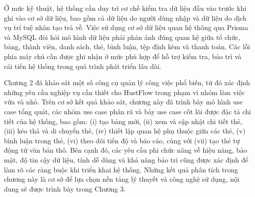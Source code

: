 \documentclass[../DoAn.tex]{subfiles}
\begin{document}
Ở mức kỹ thuật, hệ thống cần duy trì cơ chế kiểm tra dữ liệu đầu vào trước khi ghi vào cơ sở dữ liệu, bao gồm cả dữ liệu do người dùng nhập và dữ liệu do dịch vụ trí tuệ nhân tạo trả về. Việc sử dụng cơ sở dữ liệu quan hệ thông qua Prisma và MySQL đòi hỏi mô hình dữ liệu phải phản ánh đúng quan hệ giữa tổ chức, bảng, thành viên, danh sách, thẻ, bình luận, tệp đính kèm và thanh toán. Các lỗi phía máy chủ cần được ghi nhận ở mức phù hợp để hỗ trợ kiểm tra, bảo trì và cải tiến hệ thống trong quá trình phát triển lâu dài.


Chương 2 đã khảo sát một số công cụ quản lý công việc phổ biến, từ đó xác định những yêu cầu nghiệp vụ cần thiết cho HustFlow trong phạm vi nhóm làm việc vừa và nhỏ. Trên cơ sở kết quả khảo sát, chương này đã trình bày mô hình use case tổng quát, các nhóm use case phân rã và bảy use case cốt lõi được đặc tả chi tiết của hệ thống, bao gồm: (i) tạo bảng mới, (ii) xem và cập nhật chi tiết thẻ, (iii) kéo thả và di chuyển thẻ, (iv) thiết lập quan hệ phụ thuộc giữa các thẻ, (v) bình luận trong thẻ, (vi) theo dõi tiến độ và báo cáo, cùng với (vii) tạo thẻ tự động từ văn bản thô. Bên cạnh đó, các yêu cầu phi chức năng về hiệu năng, bảo mật, độ tin cậy dữ liệu, tính dễ dùng và khả năng bảo trì cũng được xác định để làm rõ các ràng buộc khi triển khai hệ thống. Những kết quả phân tích trong chương này là cơ sở để lựa chọn nền tảng lý thuyết và công nghệ sử dụng, nội dung sẽ được trình bày trong Chương 3.
\end{document}
